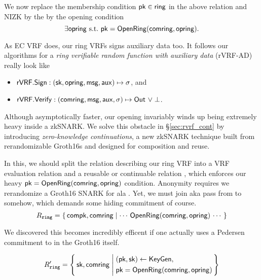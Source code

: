 We now replace the membership condition $\mathsf{pk} \in \mathsf{ring}$ in the above
relation and NIZK by the by the opening condition
$$ \exists \mathsf{opring} \textrm{\ s.t.\ } \mathsf{pk} = {\mathsf{OpenRing}}(\mathsf{comring},\mathsf{opring}) . $$
%

As EC VRF does, our ring VRFs signs auxiliary data \aux too.
It follows our algorithms for a {\em ring verifiable random function
with auxiliary data} (rVRF-AD) really look like
\begin{itemize}
\item ${\mathsf{rVRF}}.{\mathsf{Sign}} : (\mathsf{sk},\mathsf{opring},\mathsf{msg},\mathsf{aux}) \mapsto \sigma$, \quad and
\item ${\mathsf{rVRF}}.{\mathsf{Verify}} : (\mathsf{comring},\mathsf{msg},\mathsf{aux},\sigma) \mapsto {\ensuremath{\mathsf{Out}}} \,\, \lor \perp$.
\end{itemize}

Although asymptotically faster, our opening \OpenRing invariably
winds up being extremely heavy inside a zkSNARK.
We solve this obstacle in \S\ref{sec:rvrf_cont} by introducing
{\em zero-knowledge continuations}, a new zkSNARK technique built from
rerandomizable Groth16s and designed for composition and reuse.

In this, we should split the relation describing our ring VRF into
a VRF evaluation relation \Reval and a reusable or continuable relation
\Rring, which enforces our heavy $\mathsf{pk} = {\mathsf{OpenRing}}(\mathsf{comring},\mathsf{opring})$
condition.  Anonymity requires we rerandomize a Groth16 SNARK for \Rring
ala \cite[Theorem 3, Appendix C, pp. 31]{RandomizationGroth16}.
%
Yet, we must join aka pass \pk from \Rring to \Reval somehow, which
demands some hiding commitment \compk of course.
%
$$ \Rring = \Setst{ \compk, \comring }{
    \cdots \, \eprint{ \pk =}{} \OpenRing(\comring,\openring) \, \cdots
} $$

We discovered this becomes incredibly efficent if one actually uses
a Pedersen commitment to \sk in the Groth16 itself.

$$ \Rring' = \Setst{ \sk, \comring }{
    \eprint{
    (\pk,\sk) \leftarrow \KeyGen, \quad %
    \pk = \OpenRing(\comring,\openring) 
    }{
    \begin{aligned}
        &(\pk,\sk) \leftarrow \KeyGen, \\
        &\pk = \OpenRing(\comring,\openring)  \\      
    \end{aligned}
    }
} $$

